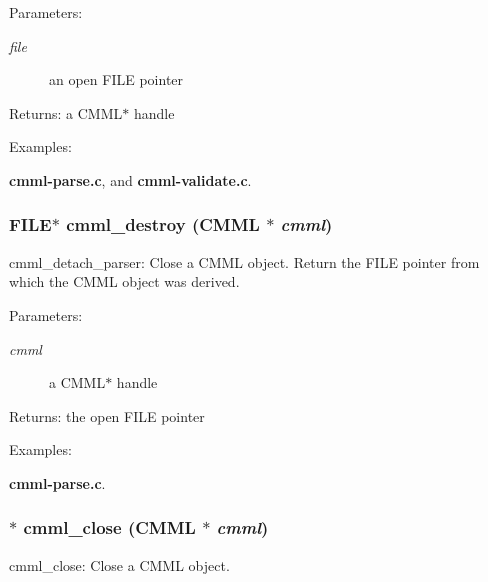 \begin{Desc}
\item[Parameters:]
\begin{description}
\item[{\em file}]an open FILE pointer\end{description}
\end{Desc}
\begin{Desc}
\item[Returns:]a CMML$\ast$ handle \end{Desc}
\begin{Desc}
\item[Examples: ]\par
{\bf cmml-parse.c}, and {\bf cmml-validate.c}.\end{Desc}
\subsubsection{\setlength{\rightskip}{0pt plus 5cm}FILE$\ast$ cmml\_\-destroy ({\bf CMML} $\ast$ {\em cmml})}\label{cmml_8h_a39}


cmml\_\-detach\_\-parser: Close a CMML object. Return the FILE pointer from which the CMML object was derived.

\begin{Desc}
\item[Parameters:]
\begin{description}
\item[{\em cmml}]a CMML$\ast$ handle\end{description}
\end{Desc}
\begin{Desc}
\item[Returns:]the open FILE pointer \end{Desc}
\begin{Desc}
\item[Examples: ]\par
{\bf cmml-parse.c}.\end{Desc}
\subsubsection{$\ast$ cmml\_\-close ({\bf CMML} $\ast$ {\em cmml})}\label{cmml_8h_a40}


cmml\_\-close: Close a CMML object.

